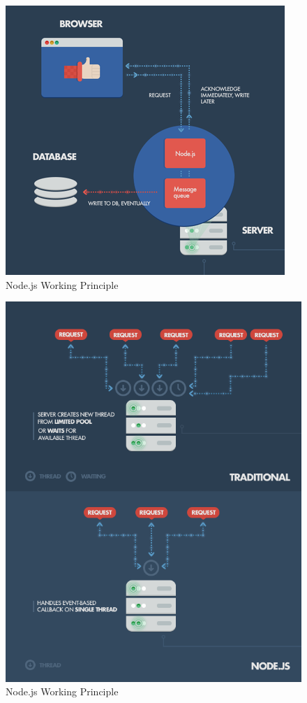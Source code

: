\begin{figure}[h]
	\centering
	\includegraphics[scale=0.4]{img/nodejs.png}
	\caption{Node.js Working Principle}
	\label{fig:5.1 cubed graph}
\end{figure}
\begin{figure}[h]
	\centering
	\includegraphics[scale=0.4]{img/nodejs1.png}
	\caption{Node.js Working Principle}
	\label{fig:5.2 cubed graph}
\end{figure}

